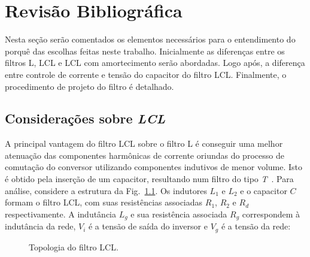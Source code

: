 
\chapter{Revisão Bibliográfica}\label{revisao}

    Nesta seção serão comentados os elementos necessários para o entendimento do
    porquê das escolhas feitas neste trabalho. Inicialmente as diferenças entre
    os filtros L, LCL e LCL com amortecimento serão abordadas. Logo após, a
    diferença entre controle de corrente e tensão do capacitor do filtro LCL.
    Finalmente, o procedimento de projeto do filtro é detalhado.


\section{Considerações sobre \emph{LCL}}

    A principal vantagem do filtro LCL sobre o filtro L é conseguir uma melhor
    atenuação das componentes harmônicas de corrente oriundas do processo de comutação do
    conversor utilizando componentes indutivos de menor volume. Isto é obtido pela
    inserção de um capacitor, resultando num filtro do tipo \emph{T}~\cite{ref:SHEN}.
    Para análise, considere a estrutura da Fig.~\ref{fig:LCL_topologia}. Os indutores
    $L_1$ e $L_2$ e o capacitor $C$ formam o filtro LCL, com suas resistências
    associadas $R_1$, $R_2$ e $R_d$ respectivamente. A indutância $L_g$ e sua
    resistência associada $R_g$ correspondem à indutância da rede, $V_i$
    é a tensão de saída do inversor e $V_g$ é a tensão da rede:

    \begin{figure}[htb]
        \renewcommand\figurename{Fig.}
        \caption{Topologia do filtro LCL.}
        \label{fig:LCL_topologia}
    \end{figure}


